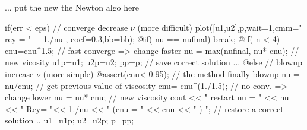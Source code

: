 \documentclass[a4paper,twoside,12pt]{book}
\def\n{\nabla}
\begin{document}
\begin{example}
{      ... put the new the Newton  algo here
        
	if(err < eps)                                                               
	 { // converge decrease $\nu$ (more difficult)                                                                                                                           
	   plot([u1,u2],p,wait=1,cmm=" rey = " + 1./nu , coef=0.3,bb=bb);                                                           
	   @if( nu == nufinal) break;                                                                                                
	   @if( n < 4) cnu=cnu^1.5; // fast converge => change faster                                                                
	   nu = max(nufinal, nu* cnu); // new vicosity                                                                              
	   u1p=u1;  u2p=u2;  pp=p; //  save correct solution ...                                                                    
	 }                                                                                                                          
	 @else 
	 {   //  blowup increase $\nu$  (more simple)                                                                         
	   @assert(cnu< 0.95); //  the method  finally  blowup                                                                                               
	   nu = nu/cnu; //  get previous value of viscosity                                                                         
	   cnu= cnu^(1./1.5); // no conv. => change lower                                                                           
	   nu = nu* cnu;  // new viscosity                                                                                           
	   cout << " restart nu = " << nu << " Rey= "<< 1./nu << "  (cnu = " << cnu << " ) \n";                                     
	   // restore a correct solution ..                                                                                           
	   u1=u1p;                                                                                                                  
	   u2=u2p;                                                                                                                  
	   p=pp;                                                                                                                    
	 }     
}        
\eFF
\end{example}
\end{document}
